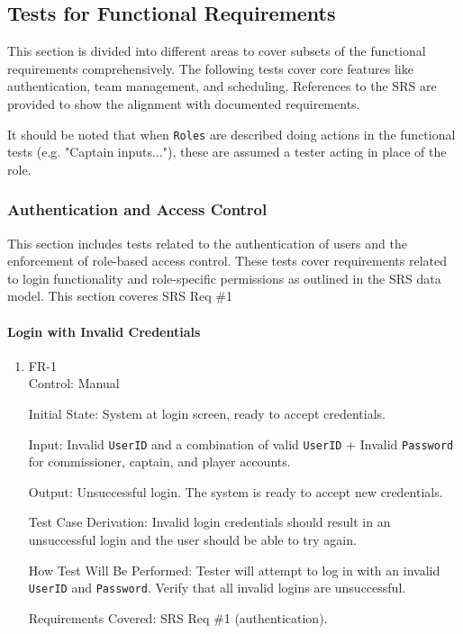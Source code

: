 \documentclass[12pt, titlepage]{article}
\begin{document}
\subsection{Tests for Functional Requirements}

This section is divided into different areas to cover subsets of the functional requirements comprehensively. The following tests cover core features like authentication, team management, and scheduling. References to the SRS are provided to show the alignment with documented requirements.

It should be noted that when \texttt{Roles} are described doing actions in the functional tests (e.g. "Captain inputs..."), these are assumed a tester acting in place of the role.

\subsubsection{Authentication and Access Control}

This section includes tests related to the authentication of users and the enforcement of role-based access control. These tests cover requirements related to login functionality and role-specific permissions as outlined in the SRS data model. This section coveres SRS Req \#1

\paragraph{Login with Invalid Credentials}

\begin{enumerate}
    \item{FR-1\\}
          Control: Manual

          Initial State: System at login screen, ready to accept credentials.

          Input: Invalid \texttt{UserID} and a combination of valid \texttt{UserID} + Invalid \texttt{Password} for commissioner, captain, and player accounts.

          Output: Unsuccessful login. The system is ready to accept new credentials.

          Test Case Derivation: Invalid login credentials should result in an unsuccessful login and the user should be able to try again.

          How Test Will Be Performed: Tester will attempt to log in with an invalid \texttt{UserID} and \texttt{Password}. Verify that all invalid logins are unsuccessful.

          Requirements Covered: SRS Req \#1 (authentication).
\end{enumerate}
\end{document}
